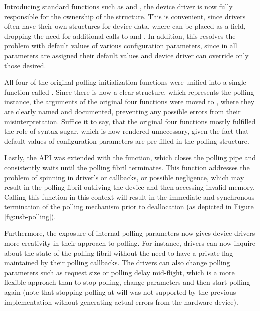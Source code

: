 Introducing standard functions such as  and
, the device driver is now fully responsible for the
ownership of the structure. This is convenient, since drivers often have their
own structures for device data, where  can be placed as a
field, dropping the need for additional calls to  and
. In addition, this resolves the problem with default values of
various configuration parameters, since in  all
parameters are assigned their default values and device driver can override only
those desired.

All four of the original polling initialization functions were unified into a
single function called . Since there is now a clear structure,
which represents the polling instance, the arguments of the original four
functions were moved to , where they are clearly named and
documented, preventing any possible errors from their misinterpretation. Suffice
it to say, that the original four functions mostly fulfilled the role of syntax
sugar, which is now rendered unnecessary, given the fact that default values of
configuration parameters are pre-filled in the polling structure.

Lastly, the API was extended with the  function, which
closes the polling pipe and consistently waits until the polling fibril
terminates. This function addresses the problem of spinning in driver's
 or  callbacks, or possible negligence,
which may result in the polling fibril outliving the device and then accessing
invalid memory. Calling this function in this context will result in the
immediate and synchronous termination of the polling mechanism prior to
deallocation (as depicted in Figure \ref{fig:usb-polling}).

Furthermore, the exposure of internal polling parameters now gives device
drivers more creativity in their approach to polling. For instance, drivers can
now inquire about the state of the polling fibril without the need to have a
private flag maintained by their polling callbacks. The drivers can also change
polling parameters such as request size or polling delay mid-flight, which is a
more flexible approach than to stop polling, change parameters and then start
polling again (note that stopping polling at will was not supported by the
previous implementation without generating actual errors from the hardware
device).

